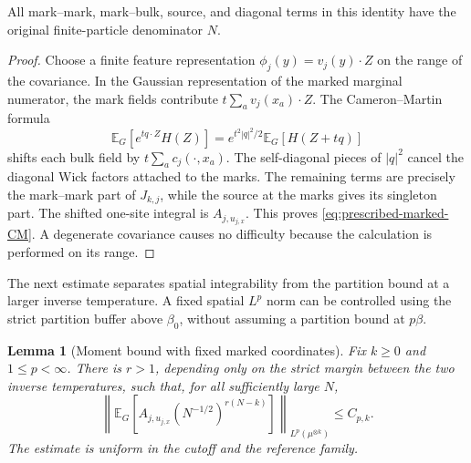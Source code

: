 \documentclass[11pt,reqno]{amsart}
\numberwithin{equation}{section}
\theoremstyle{plain}
\newtheorem{lemma}[lemma]{Lemma}
\theoremstyle{definition}
\newcommand{\E}{\mathbb E}
\newcommand{\be}{\beta}
\begin{document}
All mark--mark, mark--bulk, source, and diagonal terms in this identity have the original finite-particle denominator $N$.

\begin{proof}
Choose a finite feature representation $\phi_j(y)=v_j(y)\cdot Z$ on the range of the covariance.  In the Gaussian representation of the marked marginal numerator, the mark fields contribute $t\sum_av_j(x_a)\cdot Z$.  The Cameron--Martin formula
\begin{equation}
 \E_G[e^{tq\cdot Z}H(Z)]
 =e^{t^2|q|^2/2}\E_G[H(Z+tq)]
 \label{eq:prescribed-finite-CM}
\end{equation}
shifts each bulk field by $t\sum_ac_j(\cdot,x_a)$.  The self-diagonal pieces of $|q|^2$ cancel the diagonal Wick factors attached to the marks.  The remaining terms are precisely the mark--mark part of $J_{k,j}$, while the source at the marks gives its singleton part.  The shifted one-site integral is $A_{j,u_{j,x}}$.  This proves \eqref{eq:prescribed-marked-CM}.  A degenerate covariance causes no difficulty because the calculation is performed on its range.
\end{proof}

The next estimate separates spatial integrability from the partition bound at a larger inverse temperature. A fixed spatial $L^p$ norm can be controlled using the strict partition buffer above $\be_0$, without assuming a partition bound at $p\be$.

\begin{lemma}[Moment bound with fixed marked coordinates]
\label{lem:prescribed-anchored-moment}
Fix $k\geq0$ and $1\leq p<\infty$.  There is $r>1$, depending only on the strict margin between the two inverse temperatures, such that, for all sufficiently large $N$,
\begin{equation}
 \left\|\E_G\left[A_{j,u_{j,x}}(N^{-1/2})^{r(N-k)}\right]
 \right\|_{L^p(\mu^{\otimes k})}\leq C_{p,k}.
 \label{eq:prescribed-anchored-moment}
\end{equation}
The estimate is uniform in the cutoff and the reference family.
\end{lemma}
\end{document}
